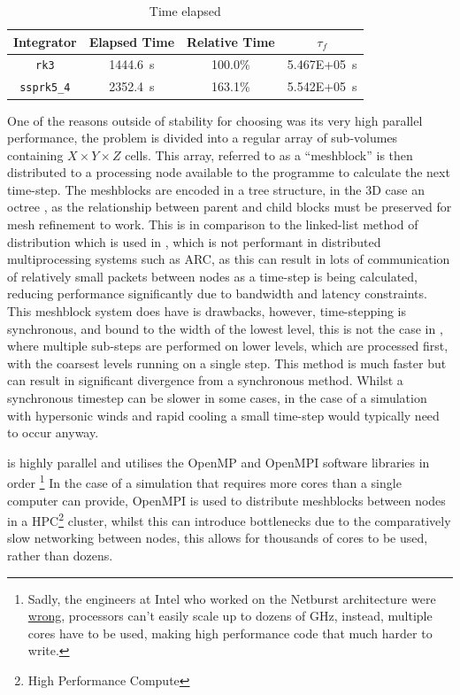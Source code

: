 \begin{table}[]
  \centering
  \begin{tabular}{cccc}
  \hline
  Integrator & Elapsed Time & Relative Time & $\tau_f$ \\ \hline
  \texttt{rk3}       & \SI{1444.6}{\second} & 100.0\% & \SI{5.467E+05}{\second}\\
  \texttt{ssprk5\_4} & \SI{2352.4}{\second} & 163.1\% & \SI{5.542E+05}{\second}\\ \hline
  \end{tabular}
  \caption{Time elapsed}
  \label{tab:rkssprkcomparison}
\end{table}



One of the reasons outside of stability for choosing \athena{} was its very high parallel performance, the problem is divided into a regular array of sub-volumes containing $X \times Y \times Z$ cells.
This array, referred to as a ``meshblock'' is then distributed to a processing node available to the programme to calculate the next time-step.
The meshblocks are encoded in a tree structure, in the 3D case an octree \parencite{stoneAthenaAdaptiveMesh2020}, as the relationship between parent and child blocks must be preserved for mesh refinement to work.
This is in comparison to the linked-list method of distribution which is used in \mg{}, which is not performant in distributed multiprocessing systems such as ARC, as this can result in lots of communication of relatively small packets between nodes as a time-step is being calculated, reducing performance significantly due to bandwidth and latency constraints.
This meshblock system does have is drawbacks, however, time-stepping is synchronous, and bound to the width of the lowest level, this is not the case in \mg{}, where multiple sub-steps are performed on lower levels, which are processed first, with the coarsest levels running on a single step.
This method is much faster but can result in significant divergence from a synchronous method.
Whilst a synchronous timestep can be slower in some cases, in the case of a simulation with hypersonic winds and rapid cooling a small time-step would typically need to occur anyway.


\athena{} is highly parallel and utilises the OpenMP and OpenMPI software libraries in order \footnote{Sadly, the engineers at Intel who worked on the Netburst architecture were \href{https://web.archive.org/web/20210412001459/https://www.anandtech.com/show/680/6}{wrong}, processors can't easily scale up to dozens of \si{\giga\hertz}, instead, multiple cores have to be used, making high performance code that much harder to write.}
In the case of a simulation that requires more cores than a single computer can provide, OpenMPI is used to distribute meshblocks between nodes in a HPC\footnote{High Performance Compute} cluster, whilst this can introduce bottlenecks due to the comparatively slow networking between nodes, this allows for thousands of cores to be used, rather than dozens.

